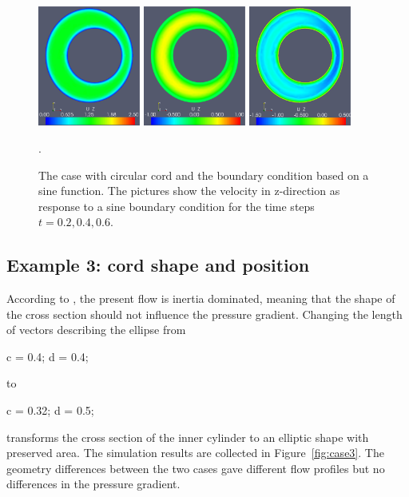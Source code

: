 \begin{figure}\begin{center}
\includegraphics[width=0.3\textwidth]{chapters/hentschel/pdf/sin_sysmax_nmb2.pdf}
\includegraphics[width=0.3\textwidth]{chapters/hentschel/pdf/sin_sysdia_nmb4.pdf}
\includegraphics[width=0.3\textwidth]{chapters/hentschel/pdf/sin_diamin_nmb6.pdf}
\caption{The case with circular cord and the boundary condition based on a
    sine function. The pictures show the velocity in z-direction as response to a sine boundary condition for the time steps $t=0.2, 0.4, 0.6$.}
\label{fig:case2}.
\end{center}\end{figure}

\subsection{Example 3: cord shape and position}

According
to \citet{LothYardimciAlperin2001,AlperinMazdaLichtorEtAl2006}, the
present flow is inertia dominated, meaning that the shape of the cross
section should not influence the pressure gradient. Changing the
length of vectors describing the ellipse from
\begin{bash}
c = 0.4;
d = 0.4;
\end{bash}
to
\begin{bash}
c = 0.32;
d = 0.5;
\end{bash}
transforms the cross section of the inner cylinder to an elliptic
shape with preserved area. The simulation results are collected in
Figure~\ref{fig:case3}. The geometry differences between the two cases
gave different flow profiles but no differences in the pressure
gradient.

